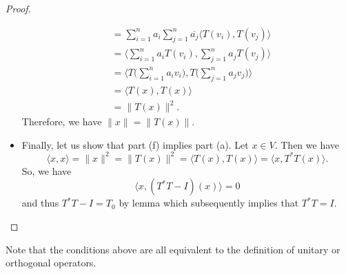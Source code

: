 \begin{proof}
\begin{itemize}
\begin{align*}
                          &= \sum_{ i=1  }^{ n } {a}_{i} \sum_{ j=1  }^{ n } \overline{{a}_{j}} \langle T({v}_{i}) , T({v}_{j}) \rangle \\
                          &= \Big\langle \sum_{ i=1  }^{ n } {a}_{i} T({v}_{i}),  \sum_{ j=1 }^{  n } {a}_{j} T({v}_{j}) \Big\rangle \\
                          &= \Big\langle T \Big(  \sum_{ i=1  }^{ n } {a}_{i} {v}_{i} \Big), T \Big(  \sum_{ j=1  }^{ n } {a}_{j} {v}_{j} \Big)  \Big\rangle \\
                          &= \langle T(x) , T(x) \rangle \\
                          &= \|T(x)\|^{2}.
            \end{align*}
            Therefore, we have \( \|x\| = \|T(x)\| \).
        \item Finally, let us show that part (f) implies part (a). Let \( x \in V  \). Then we have  
            \[  \langle x  ,  x  \rangle = \|x\|^{2} = \|T(x)\|^{2} = \langle T(x) , T(x) \rangle = \langle x  , T^{*}T(x) \rangle. \]
            So, we have
            \[  \langle x  , (T^{*}T - I) (x) \rangle = 0  \]
            and thus \( T^{*}T - I = {T}_{0} \) by lemma which subsequently implies that \( T^{*}T = I  \).
    \end{itemize}
\end{proof}
Note that the conditions above are all equivalent to the definition of unitary or orthogonal operators.

